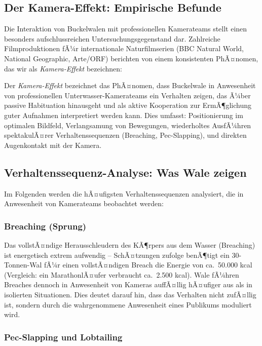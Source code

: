 ﻿\documentclass[12pt,a4paper]{article}
\theoremstyle{definition}
\theoremstyle{remark}
\begin{document}
\subsection{Der Kamera-Effekt: Empirische Befunde}

Die Interaktion von Buckelwalen mit professionellen Kamerateams stellt einen
besonders aufschlussreichen Untersuchungsgegenstand dar. Zahlreiche Filmproduktionen
fÃ¼r internationale Naturfilmserien (BBC Natural World, National Geographic,
Arte/ORF) berichten von einem konsistenten PhÃ¤nomen, das wir als
\emph{Kamera-Effekt} bezeichnen:

Der \emph{Kamera-Effekt} bezeichnet das PhÃ¤nomen, dass Buckelwale in
Anwesenheit von professionellen Unterwasser-Kamerateams ein Verhalten zeigen,
das Ã¼ber passive Habituation hinausgeht und als aktive Kooperation zur
ErmÃ¶glichung guter Aufnahmen interpretiert werden kann. Dies umfasst:
Positionierung im optimalen Bildfeld, Verlangsamung von Bewegungen,
wiederholtes AusfÃ¼hren spektakulÃ¤rer Verhaltenssequenzen (Breaching, Pec-Slapping),
und direkten Augenkontakt mit der Kamera.

\subsection{Verhaltenssequenz-Analyse: Was Wale zeigen}

Im Folgenden werden die hÃ¤ufigsten Verhaltenssequenzen analysiert, die in
Anwesenheit von Kamerateams beobachtet werden:

\subsubsection{Breaching (Sprung)}

Das vollstÃ¤ndige Herausschleudern des KÃ¶rpers aus dem Wasser (Breaching) ist
energetisch extrem aufwendig -- SchÃ¤tzungen zufolge benÃ¶tigt ein 30-Tonnen-Wal
fÃ¼r einen vollstÃ¤ndigen Breach die Energie von ca.\ 50.000 kcal (Vergleich:
ein MarathonlÃ¤ufer verbraucht ca.\ 2.500 kcal). Wale fÃ¼hren Breaches dennoch
in Anwesenheit von Kameras auffÃ¤llig hÃ¤ufiger aus als in isolierten Situationen.
Dies deutet darauf hin, dass das Verhalten nicht zufÃ¤llig ist, sondern durch die
wahrgenommene Anwesenheit eines Publikums moduliert wird.

\subsubsection{Pec-Slapping und Lobtailing}
\end{document}

